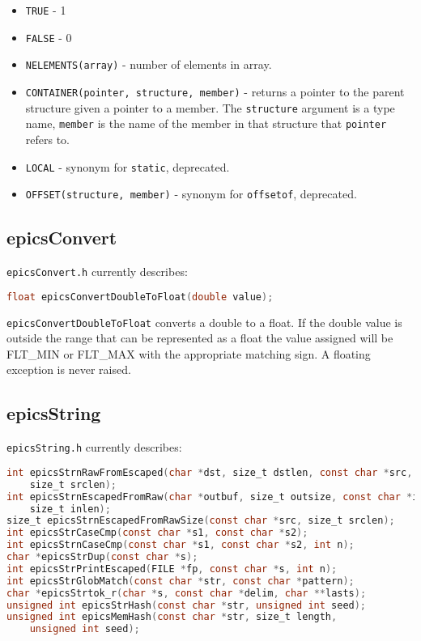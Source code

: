 \begin{itemize}

\item \verb|TRUE| - 1

\item \verb|FALSE| - 0

\item \verb|NELEMENTS(array)| - number of elements in array.

\item \verb|CONTAINER(pointer, structure, member)| - returns a pointer to the parent structure given a pointer to a member. The \verb|structure| argument is a type name, \verb|member| is the name of the member in that structure that \verb|pointer| refers to.

\item \verb|LOCAL| - synonym for \verb|static|, deprecated.

\item \verb|OFFSET(structure, member)| - synonym for \verb|offsetof|, deprecated.

\end{itemize}

\subsection{epicsConvert}

\verb|epicsConvert.h| currently describes:

\begin{lstlisting}[language=C]
float epicsConvertDoubleToFloat(double value);
\end{lstlisting}

\verb|epicsConvertDoubleToFloat| converts a double to a float.
If the double value is outside the range that can be represented as a float the value assigned will be FLT\_MIN or FLT\_MAX with the appropriate matching sign.
A floating exception is never raised.

\subsection{epicsString}

\verb|epicsString.h| currently describes:

\begin{lstlisting}[language=C]
int epicsStrnRawFromEscaped(char *dst, size_t dstlen, const char *src,
    size_t srclen);
int epicsStrnEscapedFromRaw(char *outbuf, size_t outsize, const char *inbuf,
    size_t inlen);
size_t epicsStrnEscapedFromRawSize(const char *src, size_t srclen);
int epicsStrCaseCmp(const char *s1, const char *s2);
int epicsStrnCaseCmp(const char *s1, const char *s2, int n);
char *epicsStrDup(const char *s);
int epicsStrPrintEscaped(FILE *fp, const char *s, int n);
int epicsStrGlobMatch(const char *str, const char *pattern);
char *epicsStrtok_r(char *s, const char *delim, char **lasts);
unsigned int epicsStrHash(const char *str, unsigned int seed);
unsigned int epicsMemHash(const char *str, size_t length,
    unsigned int seed);
\end{lstlisting}


